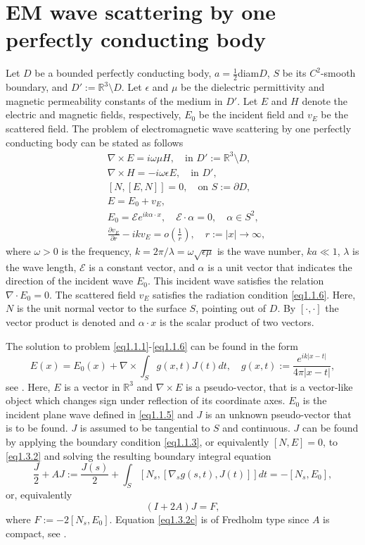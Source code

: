 \documentclass[12pt]{article}
\numberwithin{equation}{section}
\newcommand{\be}{\begin{equation}}
\newcommand{\ee}{\end{equation}}
\newcommand{\RRR}{\mathbb{R}^3}
\begin{document}
\section{EM wave scattering by one perfectly conducting body} \label{sec1}
Let $D$ be a bounded perfectly conducting body, $a=\frac{1}{2}$diam$D$, $S$ be its $C^2$-smooth boundary,  and $D':=\RRR \setminus D$. Let $\epsilon$ and $\mu$ be the dielectric permittivity and magnetic permeability constants of the medium in $D'$. Let $E$ and $H$ denote the electric and magnetic fields, respectively, $E_0$ be the incident field and $v_E$ be the scattered field. The problem of electromagnetic wave scattering by one perfectly conducting body can be stated as follows
\begin{align}
            &\nabla \times E=i \omega \mu H, \quad \text{in }D':=\RRR \setminus D, \label{eq1.1.1} \\
            &\nabla \times H=-i \omega \epsilon E, \quad \text{in }D', \label{eq1.1.2} \\
            &[N,[E, N]]=0, \quad \text{on } S:=\partial D, \label{eq1.1.3} \\
            &E=E_0+v_E,  \label{eq1.1.4} \\
            &E_0=\mathcal{E} e^{ik\alpha\cdot x}, \quad \mathcal{E} \cdot \alpha=0,
            \quad \alpha \in S^2, \label{eq1.1.5} \\
            &\frac{\partial v_E}{\partial r}-ikv_E=o\left(\frac{1}{r}\right), \quad r:=|x|\to \infty, \label{eq1.1.6}
\end{align}
where $\omega>0$ is the frequency, $k=2\pi/\lambda=\omega \sqrt{\epsilon \mu}$ is the wave number, $ka \ll 1$, $\lambda$ is the wave length, $\mathcal{E}$ is a constant vector, and $\alpha$ is a unit vector that indicates the direction of the incident wave $E_0$. This incident wave satisfies the relation $\nabla\cdot E_0=0$. The scattered field $v_E$ satisfies the radiation condition \eqref{eq1.1.6}. Here, $N$ is the unit normal vector to the surface $S$, pointing out of $D$. By $[\cdot,\cdot]$ the vector product is denoted and $\alpha \cdot x$ is the scalar product of two vectors.

The solution to problem \eqref{eq1.1.1}-\eqref{eq1.1.6} can be found in the form
\be \label{eq1.3.2}
    E(x)=E_0(x)+\nabla \times \int_S g(x,t) J(t)dt, \quad g(x,t):=\frac{e^{ik|x-t|}}{4\pi |x-t|},
\ee
see \cite{R620}.
Here, $E$ is a vector in $\RRR$ and $\nabla \times E$ is a pseudo-vector, that is a vector-like object which changes sign under reflection of its coordinate axes. $E_0$ is the incident plane wave defined in \eqref{eq1.1.5} and $J$ is an unknown pseudo-vector that is to be found. $J$ is assumed to be tangential to $S$ and continuous. $J$ can be found by applying the boundary condition \eqref{eq1.1.3}, or equivalently $[N,E]=0$, to \eqref{eq1.3.2} and solving the resulting boundary integral equation
\be \label{eq1.3.2b}
    \frac{J}{2}+AJ:=\frac{J(s)}{2}+\int_S [N_s,[\nabla_s g(s,t),J(t)]]dt=-[N_s,E_0],
\ee
or, equivalently
\be \label{eq1.3.2c}
    (I+2A)J=F,
\ee
where $F:=-2[N_s,E_0]$. Equation \eqref{eq1.3.2c} is of Fredholm type since $A$ is compact, see \cite{R652}.
\end{document}
